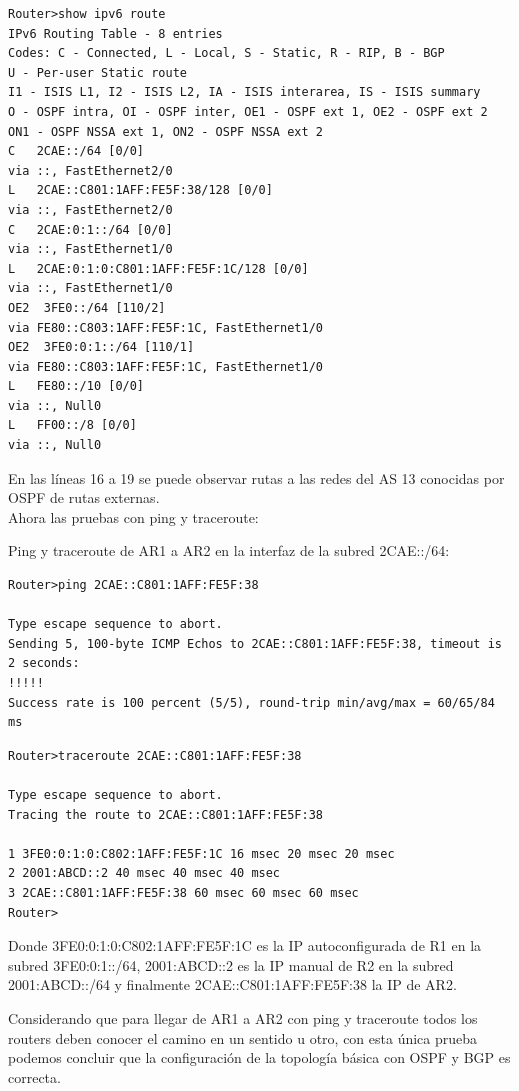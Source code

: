 \documentclass{article}
\begin{document}
\begin{lstlisting}
Router>show ipv6 route
IPv6 Routing Table - 8 entries
Codes: C - Connected, L - Local, S - Static, R - RIP, B - BGP
U - Per-user Static route
I1 - ISIS L1, I2 - ISIS L2, IA - ISIS interarea, IS - ISIS summary
O - OSPF intra, OI - OSPF inter, OE1 - OSPF ext 1, OE2 - OSPF ext 2
ON1 - OSPF NSSA ext 1, ON2 - OSPF NSSA ext 2
C   2CAE::/64 [0/0]
via ::, FastEthernet2/0
L   2CAE::C801:1AFF:FE5F:38/128 [0/0]
via ::, FastEthernet2/0
C   2CAE:0:1::/64 [0/0]
via ::, FastEthernet1/0
L   2CAE:0:1:0:C801:1AFF:FE5F:1C/128 [0/0]
via ::, FastEthernet1/0
OE2  3FE0::/64 [110/2]
via FE80::C803:1AFF:FE5F:1C, FastEthernet1/0
OE2  3FE0:0:1::/64 [110/1]
via FE80::C803:1AFF:FE5F:1C, FastEthernet1/0
L   FE80::/10 [0/0]
via ::, Null0
L   FF00::/8 [0/0]
via ::, Null0
\end{lstlisting}

En las líneas 16 a 19 se puede observar rutas a las redes del AS 13 conocidas por OSPF de rutas externas.
\\

Ahora las pruebas con ping y traceroute:

Ping y traceroute de AR1 a AR2 en la interfaz de la subred 2CAE::/64:
\begin{lstlisting}
Router>ping 2CAE::C801:1AFF:FE5F:38

Type escape sequence to abort.
Sending 5, 100-byte ICMP Echos to 2CAE::C801:1AFF:FE5F:38, timeout is 2 seconds:
!!!!!
Success rate is 100 percent (5/5), round-trip min/avg/max = 60/65/84 ms
\end{lstlisting}
\begin{lstlisting}
Router>traceroute 2CAE::C801:1AFF:FE5F:38

Type escape sequence to abort.
Tracing the route to 2CAE::C801:1AFF:FE5F:38

1 3FE0:0:1:0:C802:1AFF:FE5F:1C 16 msec 20 msec 20 msec
2 2001:ABCD::2 40 msec 40 msec 40 msec
3 2CAE::C801:1AFF:FE5F:38 60 msec 60 msec 60 msec
Router>
\end{lstlisting}

Donde 3FE0:0:1:0:C802:1AFF:FE5F:1C es la IP autoconfigurada de R1 en la subred 3FE0:0:1::/64, 2001:ABCD::2 es la IP manual de R2 en la subred 2001:ABCD::/64 y finalmente 2CAE::C801:1AFF:FE5F:38 la IP de AR2.

Considerando que para llegar de AR1 a AR2 con ping y traceroute todos los routers deben conocer el camino en un sentido u otro, con esta única prueba podemos concluir que la configuración de la topología básica con OSPF y BGP es correcta.
\end{document}
